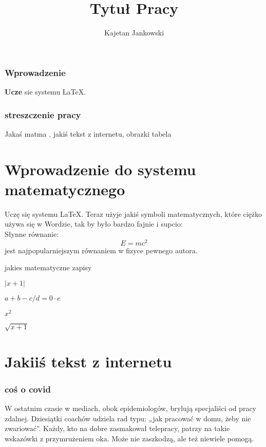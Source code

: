 \documentclass{article}
\title{Tytuł Pracy}
\author{Kajetan Jankowski}
\begin{document}
\maketitle



\section{Wprowadzenie}
\textbf{Ucze} sie systemu LaTeX.



\section{streszczenie pracy}
Jakaś matma , jakiś tekst z internetu, obrazki tabela

\newpage

\part{Wprowadzenie do systemu matematycznego} 
\label{1}
Uczę się systemu \LaTeX. Teraz użyje jakiś symboli matematycznych, które ciężko używa się w Wordzie, tak by było bardzo fajnie i supcio: \\
Słynne równanie:  \\
$$E = mc^2$$ 
jest najpopularniejszym równaniem w fizyce pewnego autora.

jakies matematyczne zapisy

$\left|x+1\right|$


$a+b-c/d=0 \cdot e$

$x^2$

$\sqrt{x+1}$ 
\part{Jakiiś tekst z internetu}
\label{2}
\section{coś o covid}
W ostatnim czasie w mediach, obok epidemiologów, brylują specjaliści od pracy zdalnej. Dziesiątki coachów udziela rad typu: „jak pracować w domu, żeby nie zwariować”. Każdy, kto na dobre zasmakował telepracy, patrzy na takie wskazówki z przymrużeniem oka. Może nie zaszkodzą, ale też niewiele pomogą.
\end{document}
